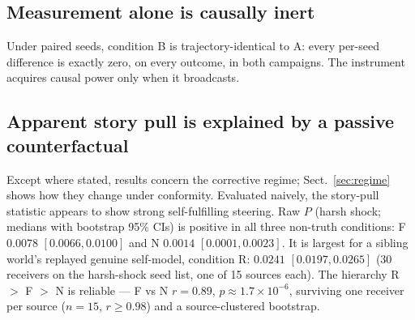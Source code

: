 \documentclass{svproc}
\begin{document}
\subsection{Measurement alone is causally inert}
Under paired seeds, condition B is trajectory-identical to A: every per-seed
difference is exactly zero, on every outcome, in both campaigns. The
instrument acquires causal power only when it broadcasts.

\subsection{Apparent story pull is explained by a passive counterfactual}
\label{sec:pull}
Except where stated, results concern the corrective regime; Sect.~\ref{sec:regime} shows how they change under conformity.
Evaluated naively, the story-pull statistic appears to show strong
self-fulfilling steering. Raw $P$ (harsh shock; medians with bootstrap
95\% CIs) is positive in all three non-truth conditions: F $0.0078$
$[0.0066, 0.0100]$ and N $0.0014$ $[0.0001, 0.0023]$. It is largest for a sibling
world's replayed genuine self-model, condition R: $0.0241$ $[0.0197, 0.0265]$
(30 receivers on the harsh-shock seed list, one of 15 sources each). The
hierarchy R $>$ F $>$ N is reliable --- F vs N $r=0.89$,
$p\!\approx\!1.7\times10^{-6}$, surviving one receiver per source ($n=15$,
$r\geq0.98$) and a source-clustered bootstrap.
\end{document}
